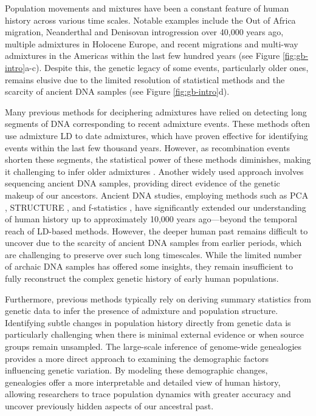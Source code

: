

Population movements and mixtures have been a constant feature of human history across various time scales. Notable examples include the Out of Africa migration, Neanderthal and Denisovan introgression over 40,000 years ago, multiple admixtures in Holocene Europe, and recent migrations and multi-way admixtures in the Americas within the last few hundred years (see Figure \ref{fig:gb-intro}a-c). Despite this, the genetic legacy of some events, particularly older ones, remains elusive due to the limited resolution of statistical methods and the scarcity of ancient DNA samples (see Figure \ref{fig:gb-intro}d).

Many previous methods for deciphering admixtures have relied on detecting long segments of DNA corresponding to recent admixture events. These methods often use admixture LD to date admixtures, which have proven effective for identifying events within the last few thousand years. However, as recombination events shorten these segments, the statistical power of these methods diminishes, making it challenging to infer older admixtures \cite{hellenthal2014genetic, loh2013inferring, moorjani2011history, patterson2012ancient}. Another widely used approach involves sequencing ancient DNA samples, providing direct evidence of the genetic makeup of our ancestors. Ancient DNA studies, employing methods such as PCA \cite{Patterson2006}, STRUCTURE \cite{Pritchard2000}, and f-statistics \cite{reich2009reconstructing,reich2012reconstructing,patterson2012ancient,haak2015massive,durand2011testing}, have significantly extended our understanding of human history up to approximately 10,000 years ago—beyond the temporal reach of LD-based methods. However, the deeper human past remains difficult to uncover due to the scarcity of ancient DNA samples from earlier periods, which are challenging to preserve over such long timescales. While the limited number of archaic DNA samples has offered some insights, they remain insufficient to fully reconstruct the complex genetic history of early human populations.

Furthermore, previous methods typically rely on deriving summary statistics from genetic data to infer the presence of admixture and population structure. Identifying subtle changes in population history directly from genetic data is particularly challenging when there is minimal external evidence or when source groups remain unsampled. The large-scale inference of genome-wide genealogies provides a more direct approach to examining the demographic factors influencing genetic variation. By modeling these demographic changes, genealogies offer a more interpretable and detailed view of human history, allowing researchers to trace population dynamics with greater accuracy and uncover previously hidden aspects of our ancestral past.

